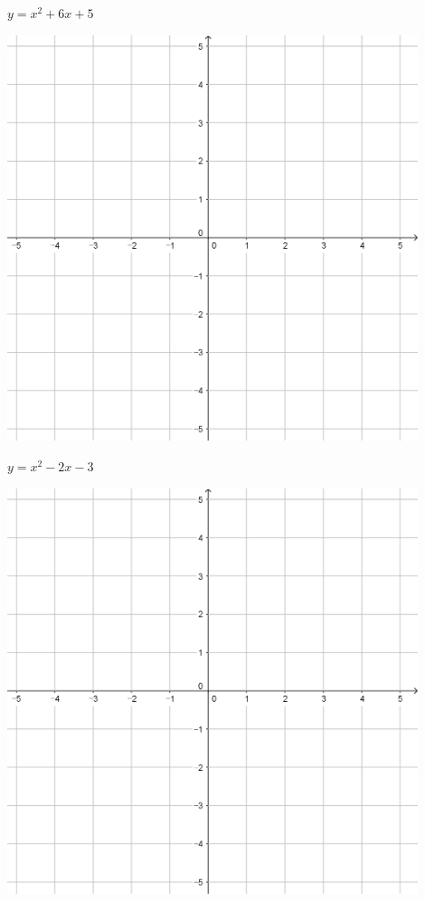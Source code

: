 \documentclass{oblivoir}
\begin{document}
\begin{minipage}{0.45\textwidth}\centering
\(y=x^2+6x+5\)
\par\bigskip\includegraphics[width=0.9\textwidth]{55}
\end{minipage}
\begin{minipage}{0.45\textwidth}\centering
\(y=x^2-2x-3\)
\par\bigskip\includegraphics[width=0.9\textwidth]{55}
\end{minipage}\bigskip\bigskip\par
\end{document}
